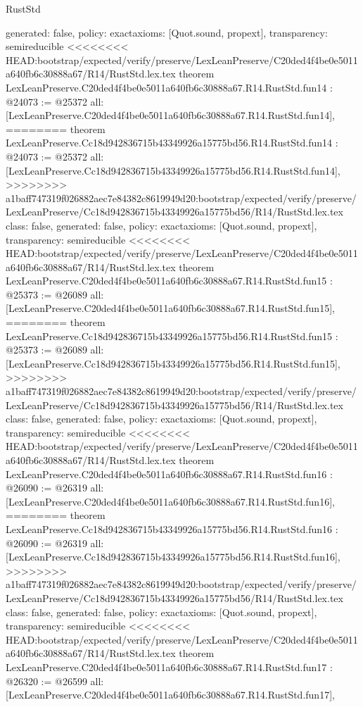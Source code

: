 \begin{lexlean}{RustStd}
\begin{coremodule}
{\begin{coremodule}
{{{{{{{{{{{{{{{{{  generated: false,
  policy: exact{axioms: [Quot.sound, propext]},
  transparency: semireducible
}
<<<<<<<< HEAD:bootstrap/expected/verify/preserve/LexLeanPreserve/C20ded4f4be0e5011a640fb6c30888a67/R14/RustStd.lex.tex
theorem LexLeanPreserve.C20ded4f4be0e5011a640fb6c30888a67.R14.RustStd.fun14 : @24073 := @25372 {
  all: [LexLeanPreserve.C20ded4f4be0e5011a640fb6c30888a67.R14.RustStd.fun14],
========
theorem LexLeanPreserve.Cc18d942836715b43349926a15775bd56.R14.RustStd.fun14 : @24073 := @25372 {
  all: [LexLeanPreserve.Cc18d942836715b43349926a15775bd56.R14.RustStd.fun14],
>>>>>>>> a1baff747319f026882aec7e84382c8619949d20:bootstrap/expected/verify/preserve/LexLeanPreserve/Cc18d942836715b43349926a15775bd56/R14/RustStd.lex.tex
  class: false,
  generated: false,
  policy: exact{axioms: [Quot.sound, propext]},
  transparency: semireducible
}
<<<<<<<< HEAD:bootstrap/expected/verify/preserve/LexLeanPreserve/C20ded4f4be0e5011a640fb6c30888a67/R14/RustStd.lex.tex
theorem LexLeanPreserve.C20ded4f4be0e5011a640fb6c30888a67.R14.RustStd.fun15 : @25373 := @26089 {
  all: [LexLeanPreserve.C20ded4f4be0e5011a640fb6c30888a67.R14.RustStd.fun15],
========
theorem LexLeanPreserve.Cc18d942836715b43349926a15775bd56.R14.RustStd.fun15 : @25373 := @26089 {
  all: [LexLeanPreserve.Cc18d942836715b43349926a15775bd56.R14.RustStd.fun15],
>>>>>>>> a1baff747319f026882aec7e84382c8619949d20:bootstrap/expected/verify/preserve/LexLeanPreserve/Cc18d942836715b43349926a15775bd56/R14/RustStd.lex.tex
  class: false,
  generated: false,
  policy: exact{axioms: [Quot.sound, propext]},
  transparency: semireducible
}
<<<<<<<< HEAD:bootstrap/expected/verify/preserve/LexLeanPreserve/C20ded4f4be0e5011a640fb6c30888a67/R14/RustStd.lex.tex
theorem LexLeanPreserve.C20ded4f4be0e5011a640fb6c30888a67.R14.RustStd.fun16 : @26090 := @26319 {
  all: [LexLeanPreserve.C20ded4f4be0e5011a640fb6c30888a67.R14.RustStd.fun16],
========
theorem LexLeanPreserve.Cc18d942836715b43349926a15775bd56.R14.RustStd.fun16 : @26090 := @26319 {
  all: [LexLeanPreserve.Cc18d942836715b43349926a15775bd56.R14.RustStd.fun16],
>>>>>>>> a1baff747319f026882aec7e84382c8619949d20:bootstrap/expected/verify/preserve/LexLeanPreserve/Cc18d942836715b43349926a15775bd56/R14/RustStd.lex.tex
  class: false,
  generated: false,
  policy: exact{axioms: [Quot.sound, propext]},
  transparency: semireducible
}
<<<<<<<< HEAD:bootstrap/expected/verify/preserve/LexLeanPreserve/C20ded4f4be0e5011a640fb6c30888a67/R14/RustStd.lex.tex
theorem LexLeanPreserve.C20ded4f4be0e5011a640fb6c30888a67.R14.RustStd.fun17 : @26320 := @26599 {
  all: [LexLeanPreserve.C20ded4f4be0e5011a640fb6c30888a67.R14.RustStd.fun17],
}}}}}}}}}}}}}}}}}}}}
\end{coremodule}}
\end{coremodule}
\end{lexlean}
